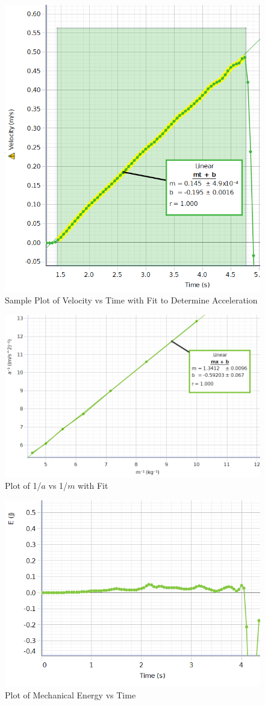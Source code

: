 \documentclass[12pt]{article}
\begin{document}
        \begin{figure}[H]
            \centering
            \includegraphics[width=0.75\linewidth]{acelleration fit.png}
            \caption{Sample Plot of Velocity vs Time with Fit to Determine Acceleration}
        \end{figure}
        \begin{figure}[H]
            \centering
            \includegraphics[width=0.75\linewidth]{a vs m.png}
            \caption{Plot of 1/\(a\) vs 1/\(m\) with Fit}
        \end{figure}
        \begin{figure}[H]
            \centering
            \includegraphics[width=0.75\linewidth]{mechE.png}
            \caption{Plot of Mechanical Energy vs Time}
        \end{figure}
        \pagebreak
\end{document}
